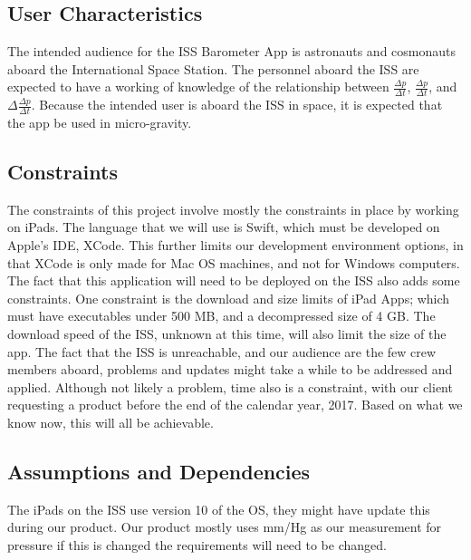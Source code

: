 \documentclass[onecolumn, draftclsnofoot,10pt, compsoc]{IEEEtran}
\def \CapstoneProjectName{ISS Barometer App }
\begin{document}
\subsection{User Characteristics}
The intended audience for the \CapstoneProjectName is astronauts and cosmonauts aboard the International Space Station.
The personnel aboard the ISS are expected to have a working of knowledge of the relationship between $\frac{\Delta p}{\Delta t}$, $\frac{\Delta p}{\Delta t}$, and $\Delta \frac{\Delta p}{\Delta t}$.
Because the intended user is aboard the ISS in space, it is expected that the app be used in micro-gravity.

\subsection{Constraints}
The constraints of this project involve mostly the constraints in place by working on iPads.
The language that we will use is Swift, which must be developed on Apple's IDE, XCode.
This further limits our development environment options, in that XCode is only made for Mac OS machines, and not for Windows computers.
The fact that this application will need to be deployed on the ISS also adds some constraints.
One constraint is the download and size limits of iPad Apps; which must have executables under 500 MB, and a decompressed size of 4 GB.
The download speed of the ISS, unknown at this time, will also limit the size of the app.
The fact that the ISS is unreachable, and our audience are the few crew members aboard, problems and updates might take a while to be addressed and applied.
Although not likely a problem, time also is a constraint, with our client requesting a product before the end of the calendar year, 2017.
Based on what we know now, this will all be achievable.

\subsection{Assumptions and Dependencies}
The iPads on the ISS use version 10 of the OS, they might have update this during our product.
Our product mostly uses mm/Hg as our measurement for pressure if this is changed the requirements will need to be changed.
\end{document}

